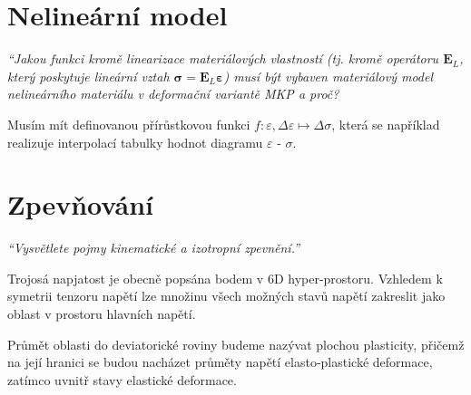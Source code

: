 \documentclass{article}
\begin{document}
\begin{multicols}{2}
	

	\vfill\null
	\columnbreak


	\section{Nelineární model}
	\emph{``Jakou funkci kromě linearizace materiálových vlastností (tj. kromě operátoru $\bm{E}_L$, který poskytuje lineární vztah $\bm{\sigma} = \bm{E}_L \bm{\varepsilon}$) musí být vybaven materiálový model nelineárního materiálu v deformační variantě MKP a proč?}

	Musím mít definovanou přírůstkovou funkci $f : \varepsilon, \Delta\varepsilon \mapsto \Delta\sigma$, která se například realizuje interpolací tabulky hodnot diagramu $\varepsilon$ - $\sigma$.

	\section{Zpevňování}
	\emph{``Vysvětlete pojmy kinematické a izotropní zpevnění.''}

	Trojosá napjatost je obecně popsána bodem v 6D hyper-prostoru. Vzhledem k symetrii tenzoru napětí lze množinu všech možných stavů napětí zakreslit jako oblast v prostoru hlavních napětí.

	Průmět oblasti do deviatorické roviny budeme nazývat plochou plasticity, přičemž na její hranici se budou nacházet průměty napětí elasto-plastické deformace, zatímco uvnitř stavy elastické deformace.


\end{multicols}
\end{document}
